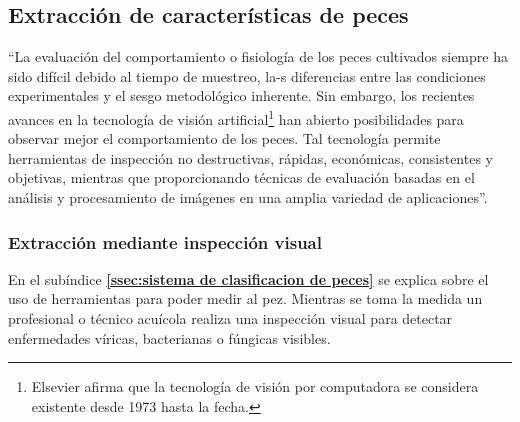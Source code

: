 
\subsection{Extracción de características de peces}

“La evaluación del comportamiento o fisiología de los peces cultivados siempre ha sido difícil debido al tiempo de muestreo, la-s diferencias entre las condiciones experimentales y el sesgo metodológico inherente. Sin embargo, los recientes avances en la tecnología de visión artificial\footnote{Elsevier afirma que la tecnología de visión por computadora se considera existente desde 1973 hasta la fecha.} han abierto posibilidades para observar mejor el comportamiento de los peces. Tal tecnología permite herramientas de inspección no destructivas, rápidas, económicas, consistentes y objetivas, mientras que proporcionando técnicas de evaluación basadas en el análisis y procesamiento de imágenes en una amplia variedad de aplicaciones”.\citep[p.~1]{Niu2018}

\subsubsection{Extracción mediante inspección visual}

En el subíndice \textbf{\ref{ssec:sistema de clasificacion de peces}} se explica sobre el uso de herramientas para poder medir al pez. Mientras se toma la medida un profesional o técnico acuícola realiza una inspección visual para detectar enfermedades víricas, bacterianas o fúngicas visibles.

